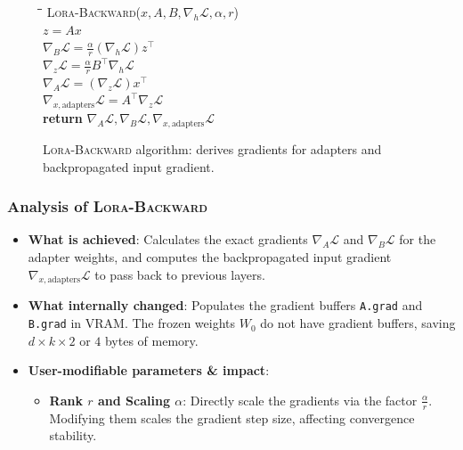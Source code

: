 \vspace{1.5em}

\begin{figure}[h]
\centering
\begin{minipage}{0.8\linewidth}
\begin{tabbing}
\quad \= \quad \= \quad \= \kill
\textsc{Lora-Backward}($x, A, B, \nabla_h \mathcal{L}, \alpha, r$) \\
\> $z = A x$ \\
\> $\nabla_B \mathcal{L} = \frac{\alpha}{r} (\nabla_h \mathcal{L}) z^\top$ \\
\> $\nabla_z \mathcal{L} = \frac{\alpha}{r} B^\top \nabla_h \mathcal{L}$ \\
\> $\nabla_A \mathcal{L} = (\nabla_z \mathcal{L}) x^\top$ \\
\> $\nabla_{x,\text{adapters}} \mathcal{L} = A^\top \nabla_z \mathcal{L}$ \\
\> \textbf{return} $\nabla_A \mathcal{L}, \nabla_B \mathcal{L}, \nabla_{x,\text{adapters}} \mathcal{L}$
\end{tabbing}
\end{minipage}
\caption{\textsc{Lora-Backward} algorithm: derives gradients for adapters and backpropagated input gradient.}
\end{figure}

\subsubsection{Analysis of \textsc{Lora-Backward}}
\begin{itemize}
  \item \textbf{What is achieved}: Calculates the exact gradients $\nabla_A \mathcal{L}$ and $\nabla_B \mathcal{L}$ for the adapter weights, and computes the backpropagated input gradient $\nabla_{x,\text{adapters}} \mathcal{L}$ to pass back to previous layers.
  \item \textbf{What internally changed}: Populates the gradient buffers \texttt{A.grad} and \texttt{B.grad} in VRAM. The frozen weights $W_0$ do not have gradient buffers, saving $d \times k \times 2$ or $4$ bytes of memory.
  \item \textbf{User-modifiable parameters \& impact}:
    \begin{itemize}
      \item \textbf{Rank $r$ and Scaling $\alpha$}: Directly scale the gradients via the factor $\frac{\alpha}{r}$. Modifying them scales the gradient step size, affecting convergence stability.
    \end{itemize}
\end{itemize}

